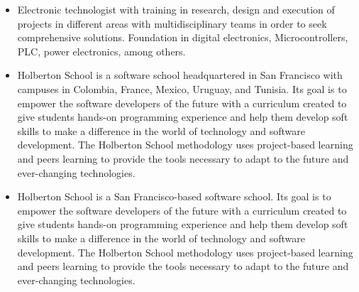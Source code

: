 \documentclass[paper=a4,fontsize=10pt,ragged2e,withhyper]{altacv}%
\begin{document}
\begin{paracol}{2}
\begin{itemize}
 \item Electronic technologist with training in research, design and execution of projects in different areas with multidisciplinary teams in order to seek comprehensive solutions. Foundation in digital electronics, Microcontrollers, PLC, power electronics, among others. 
\end{itemize}
\divider
{}
\begin{itemize}
 \item Holberton School is a software school headquartered in San Francisco with campuses in Colombia, France, Mexico, Uruguay, and Tunisia. Its goal is to empower the software developers of the future with a curriculum created to give students hands{-}on programming experience and help them develop soft skills to make a difference in the world of technology and software development. The Holberton School methodology uses project{-}based learning and peers learning to provide the tools necessary to adapt to the future and ever{-}changing technologies. 
\end{itemize}
\divider
{}
\divider
{}
\divider
{}
\divider
{}
\begin{itemize}
 \item Holberton School is a San Francisco{-}based software school. Its goal is to empower the software developers of the future with a curriculum created to give students hands{-}on programming experience and help them develop soft skills to make a difference in the world of technology and software development. The Holberton School methodology uses project{-}based learning and peers learning to provide the tools necessary to adapt to the future and ever{-}changing technologies. 
\end{itemize}
\divider
{}%

\end{paracol}%
\end{document}
